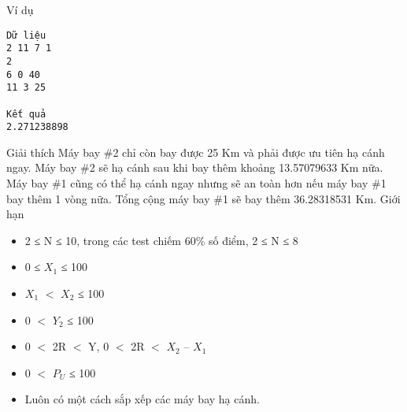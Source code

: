 Ví dụ
\begin{verbatim}
Dữ liệu
2 11 7 1
2
6 0 40
11 3 25	

Kết quả
2.271238898
\end{verbatim}
Giải thích
Máy bay \#2 chỉ còn bay được 25 Km và phải được ưu tiên hạ cánh ngay. Máy bay \#2 sẽ hạ cánh sau khi bay thêm khoảng 13.57079633 Km nữa. Máy bay \#1 cũng có thể hạ cánh ngay nhưng sẽ an toàn hơn nếu máy bay \#1 bay thêm 1 vòng nữa. Tổng cộng máy bay \#1 sẽ bay thêm 36.28318531 Km.
Giới hạn
\begin{itemize}
	\item     2 ≤ N ≤ 10, trong các test chiếm 60\% số điểm, 2 ≤ N ≤ 8   
	\item     0 ≤ $X_{1}$    ≤ 100   
	\item     $X_{1}$    $<$ $X_{2}$    ≤ 100   
	\item     0 $<$ $Y_{2}$    ≤ 100   
	\item     0 $<$ 2R $<$ Y, 0 $<$ 2R $<$ $X_{2}$    – $X_{1}$
	\item     0 $<$ $P_{U}$    ≤ 100   
	\item     Luôn có một cách sắp xếp các máy bay hạ cánh.   
\end{itemize}